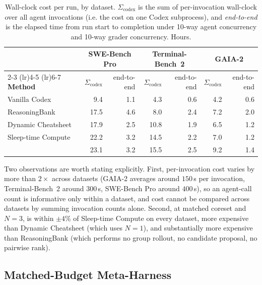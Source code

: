 \begin{table}[t]
\caption{Wall-clock cost per run, by dataset. $\Sigma_{\mathrm{codex}}$ is the sum of per-invocation wall-clock over all agent invocations (i.e. the cost on one Codex subprocess), and \emph{end-to-end} is the elapsed time from run start to completion under 10-way agent concurrency and 10-way grader concurrency. Hours.}
\label{tab:cost-walltime}
\centering
\small
\begin{tabular}{l rr rr rr}
\toprule
& \multicolumn{2}{c}{\textbf{SWE-Bench Pro}} & \multicolumn{2}{c}{\textbf{Terminal-Bench~2}} & \multicolumn{2}{c}{\textbf{GAIA-2}} \\
\cmidrule(lr){2-3} \cmidrule(lr){4-5} \cmidrule(lr){6-7}
\textbf{Method} & $\Sigma_{\mathrm{codex}}$ & end-to-end & $\Sigma_{\mathrm{codex}}$ & end-to-end & $\Sigma_{\mathrm{codex}}$ & end-to-end \\
\midrule
Vanilla Codex                                 &  9.4 & 1.1 &  4.3 & 0.6 &  4.2 & 0.6 \\
ReasoningBank \citep{ouyang2026reasoningbank}      & 17.5 & 4.6 &  8.0 & 2.4 &  7.2 & 2.0 \\
Dynamic Cheatsheet \citep{suzgun2025dynamiccheatsheet} & 17.9 & 2.5 & 10.8 & 1.9 &  6.5 & 1.2 \\
Sleep-time Compute \citep{lin2025sleeptime}           & 22.2 & 3.2 & 14.5 & 2.2 &  7.0 & 1.2 \\
\method{}                                & 23.1 & 3.2 & 15.5 & 2.5 &  9.2 & 1.4 \\
\bottomrule
\end{tabular}
\end{table}

Two observations are worth stating explicitly.
First, per-invocation cost varies by more than $2\times$ across datasets (GAIA-2 averages around $150$\,s per invocation, Terminal-Bench~2 around $300$\,s, SWE-Bench Pro around $400$\,s), so an agent-call count is informative only within a dataset, and cost cannot be compared across datasets by summing invocation counts alone.
Second, at matched coreset and $N=3$, \method{} is within $\pm 4\%$ of Sleep-time Compute on every dataset, more expensive than Dynamic Cheatsheet (which uses $N=1$), and substantially more expensive than ReasoningBank (which performs no group rollout, no candidate proposal, no pairwise rank).

\subsection{Matched-Budget Meta-Harness}\label{app:cost:mh}

